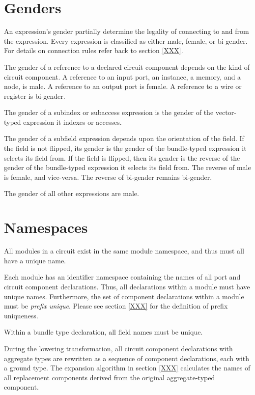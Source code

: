 \documentclass[12pt]{article}
\begin{document}
\section{Genders}

An expression's gender partially determine the legality of connecting to and from the expression. Every expression is classified as either male, female, or bi-gender. For details on connection rules refer back to section \ref{XXX}.

The gender of a reference to a declared circuit component depends on the kind of circuit component. A reference to an input port, an instance, a memory, and a node, is male. A reference to an output port is female. A reference to a wire or register is bi-gender.

The gender of a subindex or subaccess expression is the gender of the vector-typed expression it indexes or accesses.

The gender of a subfield expression depends upon the orientation of the field. If the field is not flipped, its gender is the gender of the bundle-typed expression it selects its field from. If the field is flipped, then its gender is the reverse of the gender of the bundle-typed expression it selects its field from. The reverse of male is female, and vice-versa. The reverse of bi-gender remains bi-gender.

The gender of all other expressions are male.

\section{Namespaces}

All modules in a circuit exist in the same module namespace, and thus must all have a unique name.

Each module has an identifier namespace containing the names of all port and circuit component declarations. Thus, all declarations within a module must have unique names. Furthermore, the set of component declarations within a module must be {\em prefix unique}. Please see section \ref{XXX} for the definition of prefix uniqueness.

Within a bundle type declaration, all field names must be unique.

During the lowering transformation, all circuit component declarations with aggregate types are rewritten as a sequence of component declarations, each with a ground type. The expansion algorithm in section \ref{XXX} calculates the names of all replacement components derived from the original aggregate-typed component.
\end{document}
